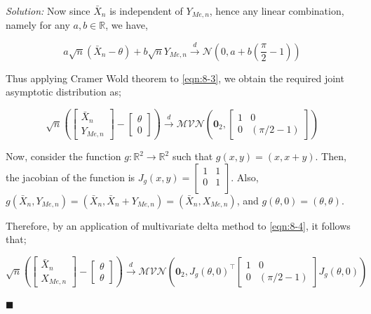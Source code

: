 \documentclass[12pt]{article}
\newcommand{\R}{\mathbb{R}}
\newcommand{\normal}{\mathcal{N}}
\theoremstyle{definition}
\newenvironment{answer}{\textit{Solution: }\quad }{ \hfill $\blacksquare$}
\numberwithin{equation}{section}
\begin{document}
\begin{answer}
    Now since $\bar{X}_n$ is independent of $Y_{Me, n}$, hence any linear combination, namely for any $a, b \in \R$, we have,

    \begin{equation}
        a \sqrt{n}(\bar{X}_n - \theta) + b \sqrt{n} Y_{Me, n} \xrightarrow{d} \normal\left( 0, a + b\left(\dfrac{\pi}{2} - 1\right) \right)
        \label{eqn:8-3}
    \end{equation}

    Thus applying Cramer Wold theorem to \cref{eqn:8-3}, we obtain the required joint asymptotic distribution as;

    \begin{equation}
        \sqrt{n} \left(
            \begin{bmatrix}
                \bar{X}_n\\ Y_{Me, n}
            \end{bmatrix} - \begin{bmatrix}
                \theta \\ 0
            \end{bmatrix}
        \right) \xrightarrow{d} \mathcal{MVN}\left( \bm{0}_2, \begin{bmatrix}
            1 & 0\\
            0 & \left(\pi/2 - 1\right)
        \end{bmatrix} \right)
        \label{eqn:8-4}
    \end{equation}

    Now, consider the function $g: \R^2 \rightarrow \R^2$ such that $g(x, y) = (x, x+y)$. Then, the jacobian of the function is $J_g(x, y) = \begin{bmatrix}
        1 & 1\\
        0 & 1\\
    \end{bmatrix}$. Also, $g(\bar{X}_n, Y_{Me,n}) = (\bar{X}_n, \bar{X}_n + Y_{Me, n}) = (\bar{X}_n, X_{Me, n})$, and $g(\theta, 0) = (\theta, \theta)$.

    Therefore, by an application of multivariate delta method to \cref{eqn:8-4}, it follows that;

    $$
    \sqrt{n} \left(
        \begin{bmatrix}
            \bar{X}_n\\ X_{Me, n}
        \end{bmatrix} - \begin{bmatrix}
            \theta \\ \theta
        \end{bmatrix}
    \right) \xrightarrow{d} \mathcal{MVN}\left( \bm{0}_2, J_g(\theta, 0)^{\intercal} \begin{bmatrix}
        1 & 0\\
        0 & \left(\pi/2 - 1\right)
    \end{bmatrix} J_g(\theta, 0) \right)
    $$


\end{answer}
\end{document}
